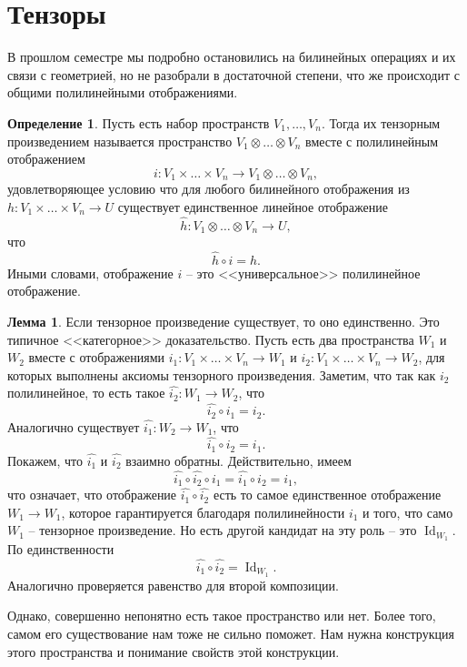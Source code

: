 \documentclass[10pt,a4paper,oneside]{book}
\theoremstyle{definition}
\newtheorem*{defn}{{\color{yellow!30!red} Определение}}
\newtheorem{lem}{{\color{green!50!black} Лемма}}
\newcommand{\id}{\operatorname{Id}}
\def\dfn{\begin{defn}}
\def\edfn{\end{defn}}
\def\lm{\begin{lem}}
\def\elm{\end{lem}}
\begin{document}
\section{Тензоры}

В прошлом семестре мы подробно остановились на билинейных операциях и их связи с геометрией, но не разобрали в достаточной степени, что же происходит с общими полилинейными отображениями.

\dfn Пусть есть набор пространств $V_1, \dots,V_n$. Тогда их тензорным произведением называется пространство 
$V_1\otimes \dots \otimes V_n$ вместе с полилинейным отображением
$$i \colon V_1 \times \dots \times V_n \to V_1 \otimes \dots \otimes V_n,$$
удовлетворяющее условию что для любого билинейного отображения из $h\colon V_1\times \dots \times V_n \to U$ существует единственное линейное отображение 
$$\hat{h}\colon V_1\otimes \dots \otimes V_n \to U,$$
что 
$$\hat{h}\circ i=h.$$
Иными словами, отображение $i$ -- это <<универсальное>> полилинейное отображение.
\edfn 


\lm Если тензорное произведение существует, то оно единственно.
\proof Это типичное <<категорное>> доказательство. Пусть есть два пространства $W_1$ и $W_2$ вместе с отображениями $i_1 \colon V_1\times \dots\times V_n \to W_1$ и $i_2 \colon V_1\times \dots\times V_n \to W_2$, для которых выполнены аксиомы тензорного произведения. Заметим, что так как $i_2$ полилинейное, то есть такое $\hat{i_2} \colon W_1 \to W_2$, что $$\hat{i_2}\circ i_1= i_2.$$ 
Аналогично существует $\hat{i_1} \colon W_2 \to W_1$, что
$$\hat{i_1}\circ i_2= i_1.$$ 
Покажем, что $\hat{i_1} $ и $\hat{i_2}$ взаимно обратны. Действительно, имеем
$$\hat{i_1}\circ \hat{i_2}\circ i_1= \hat{i_1}\circ i_2= i_1,$$
что означает, что отображение $\hat{i_1}\circ \hat{i_2}$ есть то самое единственное отображение $W_1\to W_1$, которое гарантируется благодаря полилинейности $i_1$ и того, что само $W_1$ -- тензорное произведение. Но есть другой кандидат на эту роль -- это $\id_{W_1}$. По единственности 
$$\hat{i_1}\circ \hat{i_2}=\id_{W_1}.$$
Аналогично проверяется равенство для второй композиции.
\endproof
\elm


Однако, совершенно непонятно есть такое пространство или нет. Более того, самом его существование нам тоже не сильно поможет. Нам нужна конструкция этого пространства и понимание свойств этой конструкции.
\end{document}

